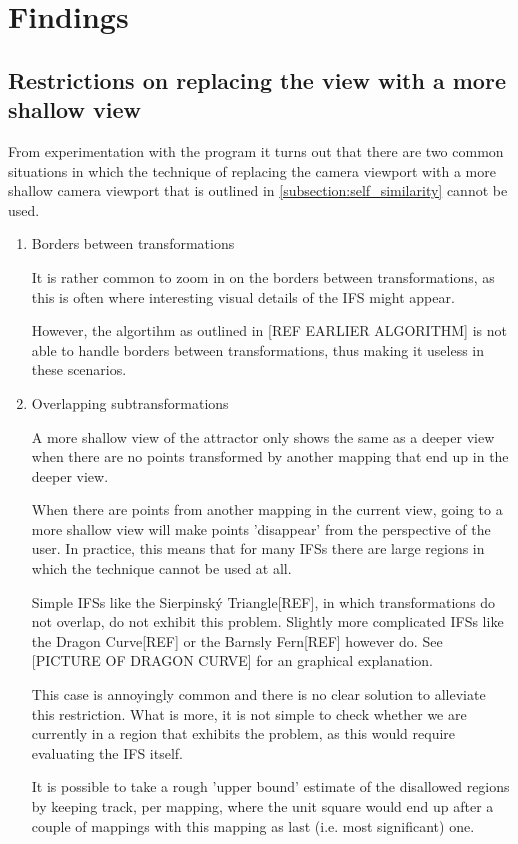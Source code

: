 \documentclass[11pt]{article}
\begin{document}

\section{Findings}
\label{sec:org59b2415}

\subsection{Restrictions on replacing the view with a more shallow view}
\label{sec:org0429ae8}

From experimentation with the program it turns out that there are two common situations
in which the technique of replacing the camera viewport with a more shallow camera viewport that is outlined in \autoref{subsection:self_similarity} cannot be used.

\begin{enumerate}
\item Borders between transformations
\label{sec:org2c2571e}

It is rather common to zoom in on the borders between transformations, as this is often
where interesting visual details of the IFS might appear.

However, the algortihm as outlined in [REF EARLIER ALGORITHM] is not able to handle borders between transformations,
thus making it useless in these scenarios.

\item Overlapping subtransformations
\label{sec:org38d82a8}

A more shallow view of the attractor only shows the same as a deeper view when
there are no points transformed by another mapping that end up in the deeper view.

When there are points from another mapping in the current view, 
going to a more shallow view will make points 'disappear' from the perspective of the user.
In practice, this means that for many IFSs there are large regions in which the technique cannot be used at all.

Simple IFSs like the Sierpinský Triangle[REF], in which transformations
do not overlap, do not exhibit this problem. 
Slightly more complicated IFSs like the Dragon Curve[REF] or the Barnsly Fern[REF] however do.
See [PICTURE OF DRAGON CURVE] for an graphical explanation.

This case is annoyingly common and there is no clear solution to alleviate this restriction.
What is more, it is not simple to check whether we are currently in a region that exhibits the problem,
as this would require evaluating the IFS itself.

It is possible to take a rough 'upper bound' estimate of the disallowed regions by keeping track, 
per mapping, where the unit square would end up after a couple of mappings with this mapping as last (i.e. most significant) one.

\end{enumerate}
\end{document}
